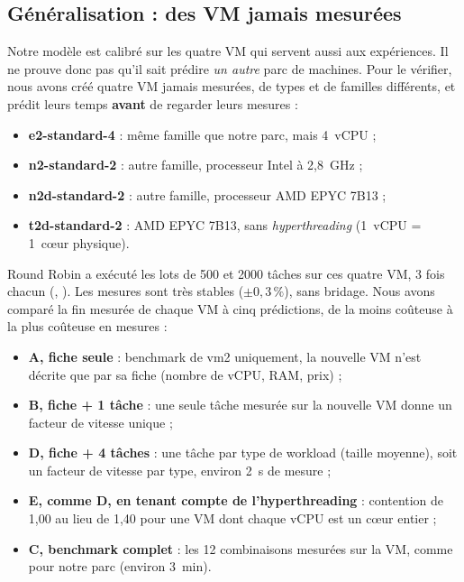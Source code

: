 \subsection{Généralisation : des VM jamais mesurées}
\label{sec:generalisation}

Notre modèle est calibré sur les quatre VM qui servent aussi aux expériences. Il
ne prouve donc pas qu'il sait prédire \emph{un autre} parc de machines. Pour le
vérifier, nous avons créé quatre VM jamais mesurées, de types et de familles
différents, et prédit leurs temps \textbf{avant} de regarder leurs mesures :

\begin{itemize}
  \item \textbf{e2-standard-4} : même famille que notre parc, mais 4~vCPU ;
  \item \textbf{n2-standard-2} : autre famille, processeur Intel à 2,8~GHz ;
  \item \textbf{n2d-standard-2} : autre famille, processeur AMD EPYC 7B13 ;
  \item \textbf{t2d-standard-2} : AMD EPYC 7B13, sans \emph{hyperthreading}
        (1~vCPU = 1~cœur physique).
\end{itemize}

Round Robin a exécuté les lots de 500 et 2000 tâches sur ces quatre VM, 3 fois
chacun (\mesure{}, ). Les mesures sont très stables
($\pm 0{,}3\,\%$), sans bridage. Nous avons comparé la fin mesurée de chaque VM à
cinq prédictions, de la moins coûteuse à la plus coûteuse en mesures :

\begin{itemize}
  \item \textbf{A, fiche seule} : benchmark de vm2 uniquement, la nouvelle VM
        n'est décrite que par sa fiche (nombre de vCPU, RAM, prix) ;
  \item \textbf{B, fiche + 1 tâche} : une seule tâche mesurée sur la nouvelle VM
        donne un facteur de vitesse unique ;
  \item \textbf{D, fiche + 4 tâches} : une tâche par type de workload (taille
        moyenne), soit un facteur de vitesse par type, environ 2~s de mesure ;
  \item \textbf{E, comme D, en tenant compte de l'hyperthreading} : contention
        de 1,00 au lieu de 1,40 pour une VM dont chaque vCPU est un cœur entier ;
  \item \textbf{C, benchmark complet} : les 12 combinaisons mesurées sur la VM,
        comme pour notre parc (environ 3~min).
\end{itemize}

